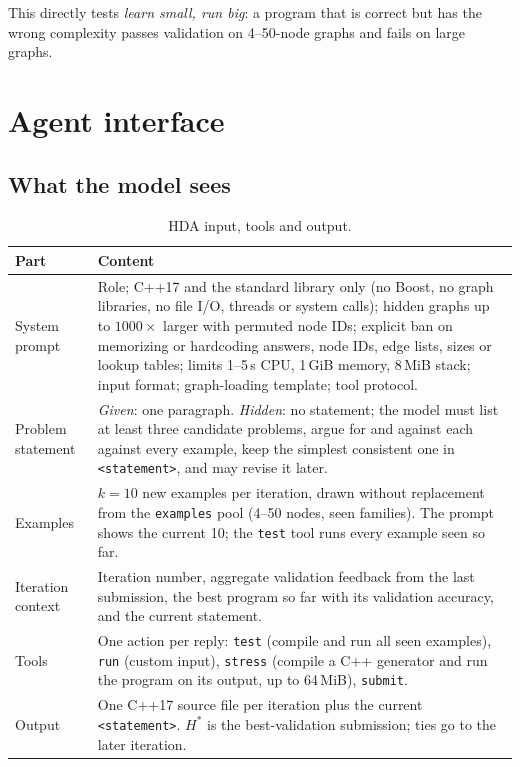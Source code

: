 \documentclass[11pt]{article}
\begin{document}
This directly tests \emph{learn small, run big}: a program that is correct but
has the wrong complexity passes validation on 4--50-node graphs and fails on
large graphs.

\section{Agent interface}

\subsection{What the model sees}

\begin{table}[h]
\centering
\small
\begin{tabular}{p{3.1cm}p{10.3cm}}
\toprule
Part & Content \\
\midrule
System prompt & Role; C++17 and the standard library only (no Boost, no graph
libraries, no file I/O, threads or system calls); hidden graphs up to $1000\times$
larger with permuted node IDs; explicit ban on memorizing or hardcoding
answers, node IDs, edge lists, sizes or lookup tables; limits 1--5\,s CPU,
1\,GiB memory, 8\,MiB stack; input format; graph-loading template; tool
protocol. \\
Problem statement & \emph{Given}: one paragraph. \emph{Hidden}: no statement;
the model must list at least three candidate problems, argue for and against
each against every example, keep the simplest consistent one in
\texttt{<statement>}, and may revise it later. \\
Examples & $k=10$ new examples per iteration, drawn without replacement from
the \texttt{examples} pool (4--50 nodes, seen families). The prompt shows the
current 10; the \texttt{test} tool runs every example seen so far. \\
Iteration context & Iteration number, aggregate validation feedback from the
last submission, the best program so far with its validation accuracy, and the
current statement. \\
Tools & One action per reply: \texttt{test} (compile and run all seen examples),
\texttt{run} (custom input), \texttt{stress} (compile a C++ generator and run
the program on its output, up to 64\,MiB), \texttt{submit}. \\
Output & One C++17 source file per iteration plus the current
\texttt{<statement>}. $H^*$ is the best-validation submission; ties go to the
later iteration. \\
\bottomrule
\end{tabular}
\caption{HDA input, tools and output.}
\end{table}
\end{document}
